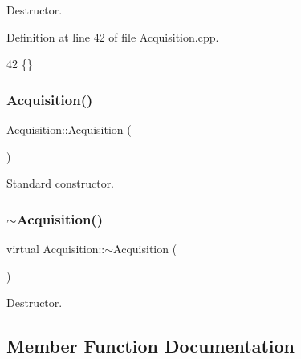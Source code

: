 Destructor. 



Definition at line 42 of file Acquisition.\+cpp.


\begin{DoxyCode}
42 \{\} 
\end{DoxyCode}
\mbox{\label{classAcquisition_aa7d3138495a4a8888c21b33f4d657732}} 
\subsubsection{\texorpdfstring{Acquisition()}{Acquisition()}\hspace{0.1cm}{\footnotesize\ttfamily [2/2]}}
{\footnotesize\ttfamily \hyperlink{classAcquisition_1_1Acquisition}{Acquisition\+::\+Acquisition} (\begin{DoxyParamCaption}{ }\end{DoxyParamCaption})}



Standard constructor. 

\mbox{\label{classAcquisition_af697b51bd72afcfe8f9f3f368743d20d}} 
\subsubsection{\texorpdfstring{$\sim$\+Acquisition()}{~Acquisition()}\hspace{0.1cm}{\footnotesize\ttfamily [2/2]}}
{\footnotesize\ttfamily virtual Acquisition\+::$\sim$\+Acquisition (\begin{DoxyParamCaption}{ }\end{DoxyParamCaption})\hspace{0.3cm}{\ttfamily [virtual]}}



Destructor. 



\subsection{Member Function Documentation}
\mbox{\label{classAcquisition_a8af496b6202d2509814e3b02197a5e73}} 

